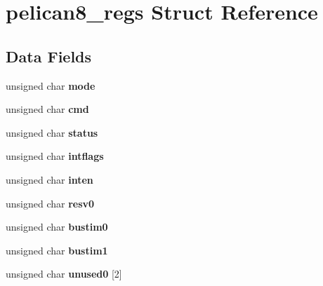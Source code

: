 \hypertarget{structpelican8__regs}{}\section{pelican8\+\_\+regs Struct Reference}
\label{structpelican8__regs}
\subsection*{Data Fields}
\begin{DoxyCompactItemize}
\item 
\mbox{\label{structpelican8__regs_a1c69193bd08fd758e3e9212312a49964}} 
unsigned char {\bfseries mode}
\item 
\mbox{\label{structpelican8__regs_a96242057f132e4b3285f4443f8a536a9}} 
unsigned char {\bfseries cmd}
\item 
\mbox{\label{structpelican8__regs_a7d3f137eacba3b2c51d3e34d34c86825}} 
unsigned char {\bfseries status}
\item 
\mbox{\label{structpelican8__regs_ac4128f592c947c5ec10187159d091b3e}} 
unsigned char {\bfseries intflags}
\item 
\mbox{\label{structpelican8__regs_a34eef3a08fa333afc37312c961a887ce}} 
unsigned char {\bfseries inten}
\item 
\mbox{\label{structpelican8__regs_af485a7b99046f928d4ded3dc18c66f8c}} 
unsigned char {\bfseries resv0}
\item 
\mbox{\label{structpelican8__regs_ae75e8c05aa7dac8626e360a72c2c1964}} 
unsigned char {\bfseries bustim0}
\item 
\mbox{\label{structpelican8__regs_ad6bd37a874a9076217e2c6ee42f9c6c8}} 
unsigned char {\bfseries bustim1}
\item 
\mbox{\label{structpelican8__regs_a2346c08b83774f54af3179a21ab7533b}} 
unsigned char {\bfseries unused0} \mbox{[}2\mbox{]}
\item 
\mbox{\label{structpelican8__regs_a475710efaf7114a8f2c15a272d2590c3}} 

\end{DoxyCompactItemize}
